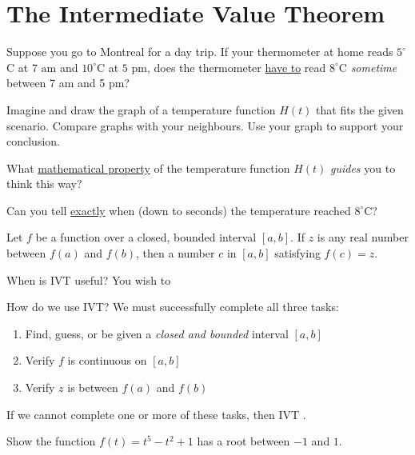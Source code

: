 \documentclass[../main.tex]{subfiles}
\begin{document}
 \section{The Intermediate Value Theorem}
\faComments{} Suppose you go to Montreal for a day trip. If your thermometer at home reads \(5^{\circ}\)C at \(7 \text{ am}\) and \({10}^{\circ}\)C at \(5\text{ pm}\), does the thermometer \underline{have to} read \({8}^{\circ}\)C \emph{sometime} between 7 am and 5 pm?


Imagine and draw the graph of a temperature function \(H(t)\) that fits the given scenario. Compare graphs with your neighbours. Use your graph to support your conclusion.

\begin{figure}[!h]  %
  \centering
  
  \label{fig:label}
\end{figure}

What \underline{mathematical property} of the temperature function \(H(t)\) \emph{guides} you to think this way?


Can you tell \underline{exactly} when (down to seconds) the temperature reached \(8^{\circ}\)C?


\begin{mdframed}[style=withref]
  Let \(f\) be a \underline{\hspace{1in}} function over a closed, bounded interval \([a,b]\). If \(z\) is any real number between \(f(a)\) and \(f(b)\), then \underline{\hspace{1in}} a number \(c\) in \([a,b]\) satisfying \(f(c) = z\).

\end{mdframed}

When is IVT useful? You wish to 
\large{}

How do we use IVT? We must successfully complete all three tasks: 
\begin{enumerate}[label=(IVT \arabic*)]
  \item Find, guess, or be given {a \emph{closed and bounded} interval \([a,b]\)}
  \item Verify {\(f\) is continuous on \([a,b]\)}
  \item Verify {\(z\) is between \(f(a)\) and \(f(b)\)}
\end{enumerate}
If we cannot complete one or more of these tasks, then IVT .

\begin{example}
  Show the function \(f(t) = t^{5} - t^{2} + 1\) has a root between \(-1\) and \(1\).
\end{example}
\end{document}

